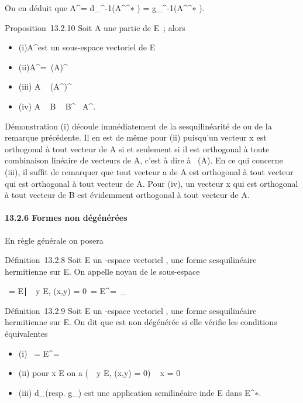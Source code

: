 \documentclass[]{article}
\begin{document}
On en déduit que A^\bot =
d\_\phi^-1(A^\bot^∗ ) =
g\_\phi^-1(A^\bot^∗ ).

Proposition~13.2.10 Soit A une partie de E~; alors

\begin{itemize}
\itemsep1pt\parskip0pt
\item
  (i)A^\bot est un sous-espace vectoriel de E
\item
  (ii)A^\bot =\
  \mathrmVect(A)^\bot
\item
  (iii) A \subset~ (A^\bot)^\bot
\item
  (iv) A \subset~ B \rigtharrow~ B^\bot\subset~ A^\bot.
\end{itemize}

Démonstration (i) découle immédiatement de la sesquilinéarité de \phi ou de
la remarque précédente. Il en est de même pour (ii) puisqu'un vecteur x
est orthogonal à tout vecteur de A si et seulement si il est orthogonal
à toute combinaison linéaire de vecteurs de A, c'est à dire à
\mathrmVect~(A). En ce qui
concerne (iii), il suffit de remarquer que tout vecteur a de A est
orthogonal à tout vecteur qui est orthogonal à tout vecteur de A. Pour
(iv), un vecteur x qui est orthogonal à tout vecteur de B est évidemment
orthogonal à tout vecteur de A.

\paragraph{13.2.6 Formes non dégénérées}

En règle générale on posera

Définition~13.2.8 Soit E un -espace vectoriel , \phi une forme
sesquilinéaire hermitienne sur E. On appelle noyau de \phi le sous-espace

\mathrmKer~\phi =
\x \in
E∣\forall~~y \in E, \phi(x,y) =
0\ = E^\bot =\
\mathrmKerd\_ \phi

Définition~13.2.9 Soit E un -espace vectoriel , \phi une forme
sesquilinéaire hermitienne sur E. On dit que \phi est non dégénérée si elle
vérifie les conditions équivalentes

\begin{itemize}
\itemsep1pt\parskip0pt
\item
  (i) \mathrmKer~\phi =
  E^\bot = \0\
\item
  (ii) pour x \in E on a \left
  (\forall~~y \in E, \phi(x,y) = 0\right ) \rigtharrow~
  x = 0
\item
  (iii) d\_\phi (resp. g\_\phi) est une application
  semilinéaire in\jmathective de E dans E^∗.
\end{itemize}
\end{document}
